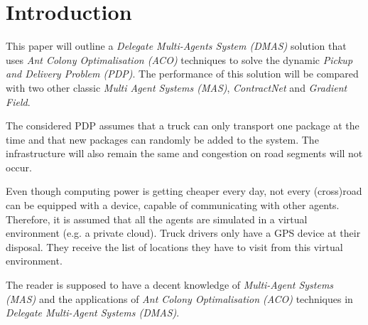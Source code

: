 \section{Introduction}
\label{sec:intro}


\npar This paper will outline a \textit{Delegate Multi-Agents System (DMAS)}
solution that uses \textit{Ant Colony Optimalisation (ACO)} techniques to solve
the dynamic \textit{Pickup and Delivery Problem (PDP)}. The performance of this
solution will be compared with two other classic \textit{Multi Agent Systems
(MAS)}, \textit{ContractNet} and \textit{Gradient Field}.

\npar The considered PDP assumes that a truck can only transport one package at
the time and that new packages can randomly be added to the system. The
infrastructure will also remain the same and congestion on road segments will
not occur.

\npar Even though computing power is getting cheaper every day, not every
(cross)road can be equipped with a device, capable of communicating with other
agents. Therefore, it is assumed that all the agents are simulated in a virtual
environment (e.g. a private cloud). Truck drivers only have a GPS device at
their disposal. They receive the list of locations they have to visit from this
virtual environment.

\npar The reader is supposed to have a decent knowledge of \textit{Multi-Agent
Systems (MAS)} and the applications of \textit{Ant Colony Optimalisation (ACO)}
techniques in \textit{Delegate Multi-Agent Systems (DMAS)}.

